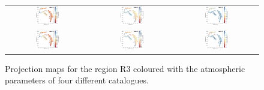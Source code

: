 \documentclass{aa}
\begin{document}
\begin{appendix}
\begin{figure}[htbp]
\begin{tabular}{ccc}
        \includegraphics[width=0.3\textwidth]{Plots/tsne_params/tsne_R3_Teff_StarHorse2.pdf} &
        \includegraphics[width=0.3\textwidth]{Plots/tsne_params/tsne_R3_logg_StarHorse2.pdf} &
        \includegraphics[width=0.3\textwidth]{Plots/tsne_params/tsne_R3_FeH_StarHorse2.pdf} \\
        \includegraphics[width=0.3\textwidth]{Plots/tsne_params/tsne_R3_Teff_XP-LAMOST.pdf} &
        \includegraphics[width=0.3\textwidth]{Plots/tsne_params/tsne_R3_logg_XP-LAMOST.pdf} &
        \includegraphics[width=0.3\textwidth]{Plots/tsne_params/tsne_R3_FeH_XP-LAMOST.pdf} \\
    \end{tabular}
    \caption{Projection maps for the region R3 coloured with the atmospheric parameters of four different catalogues.}
\end{figure}


\end{appendix}
\end{document}

